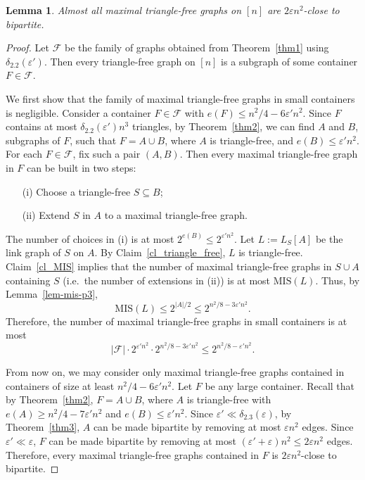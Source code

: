 \documentclass[12pt]{article}
\newtheorem{lemma}[theorem]{Lemma}
\theoremstyle{definition}
\theoremstyle{definition}
\theoremstyle{definition}
\theoremstyle{definition}
\theoremstyle{definition}
\theoremstyle{definition}
\theoremstyle{definition}
\newcommand{\ep}{\varepsilon}
\newcommand{\de}{\delta}
\newcommand{\cF}{\mathcal{F}}
\newcommand{\3}{\bf{3}}
\newcommand{\MIS}{\mathrm{MIS}}
\begin{document}
\begin{lemma}\label{lem-large}
Almost all maximal triangle-free graphs on $[n]$ are $2\ep n^2$-close to bipartite.
\end{lemma}
\begin{proof}
Let $\cF$ be the family of graphs obtained from Theorem~\ref{thm1} using $\de_{2.2}(\ep')$. Then every triangle-free graph on $[n]$ is a subgraph of some container $F\in\cF$.

We first show that the family of maximal triangle-free graphs in small containers is negligible. Consider a container $F\in \cF$ with $e(F)\leq n^2/4-6\ep' n^2$. Since $F$ contains at most $\de_{2.2}(\ep') n^3$ triangles, by Theorem~\ref{thm2}, we can find $A$ and $B$, subgraphs of $F$, such that $F=A\cup B$,  where $A$ is triangle-free, and $e(B)\le \ep' n^2$. For each $F\in\cF$, fix such a pair $(A,B)$. Then every maximal triangle-free graph in $F$ can be built in two steps:
\begin{enumerate}
\setlength{\itemsep}{1pt}
  \setlength{\parskip}{0pt}
  \setlength{\parsep}{0pt}
  \item[(i)] Choose a triangle-free $S\subseteq B$;
\item[(ii)] Extend $S$ in $A$ to a maximal triangle-free graph.
\end{enumerate}
The number of choices in (i) is at most $2^{e(B)}\le 2^{\ep' n^2}$. Let $L:=L_S[A]$ be the link graph of $S$ on $A$. By Claim~\ref{cl_triangle_free}, $L$ is triangle-free. Claim~\ref{cl_MIS} implies that the number of maximal triangle-free graphs in $S\cup A$ containing $S$ (i.e.~the number of extensions in (ii)) is at most $\MIS(L)$. Thus, by Lemma~\ref{lem-mis-p3},
$$ \MIS(L) \le 2^{|A|/2}\le 2^{n^2/8-3\ep' n^2}. $$
Therefore, the number of maximal triangle-free graphs in small containers is at most
$$|\cF|\cdot 2^{\ep' n^2}\cdot 2^{n^2/8-3\ep' n^2}\le 2^{n^2/8-\ep' n^2}.$$

From now on, we may consider only maximal triangle-free graphs contained in containers of size at least $n^2/4-6\ep' n^2$. Let $F$ be any large container. Recall that by Theorem~\ref{thm2}, $F=A\cup B$, where $A$ is triangle-free with $e(A)\ge n^2/4-7\ep' n^2$ and $e(B)\le \ep' n^2$. Since $\ep'\ll \de_{2.3}(\ep)$, by Theorem~\ref{thm3}, $A$ can be made bipartite by removing at most $\ep n^2$ edges. Since $\ep'\ll \ep$, $F$ can be made bipartite by removing at most $(\ep'+\ep)n^2\le 2\ep n^2$ edges. Therefore, every maximal triangle-free graphs contained in $F$ is $2\ep n^2$-close to bipartite.
\end{proof}
\end{document}
